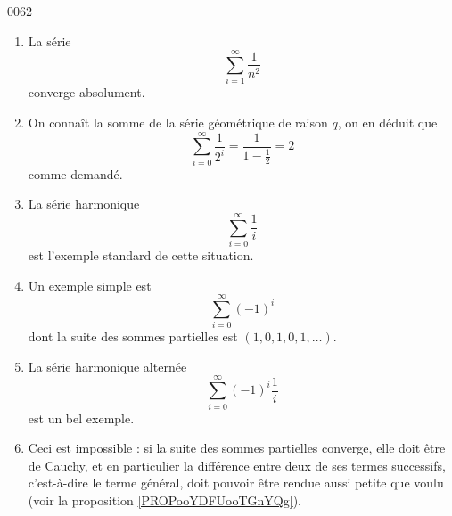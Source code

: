 
\begin{corrige}{0062}

\begin{enumerate}

\item
La série
\begin{equation*}
	\sum_{i=1}^\infty \frac{1}{n^2}
\end{equation*}
converge absolument.

\item
On connaît la somme de la série géométrique de raison $q$, on en
  déduit que
  \begin{equation*}
    \sum_{i=0}^\infty \frac1{2^i} = \frac1{1-\frac12} = 2
  \end{equation*}
  comme demandé.

\item
La série harmonique
  \begin{equation*}
    \sum_{i=0}^\infty \frac1i
  \end{equation*}
  est l'exemple standard de cette situation.

\item
Un exemple simple est
  \begin{equation*}
    \sum_{i=0}^\infty {(-1)^i}
  \end{equation*}
  dont la suite des sommes partielles est $(1, 0, 1, 0, 1, \ldots)$.

\item
La série harmonique alternée
  \begin{equation*}
    \sum_{i=0}^\infty {(-1)}^i\frac1i
  \end{equation*}
  est un bel exemple.

\item
Ceci est impossible : si la suite des sommes partielles converge, elle doit être de Cauchy, et en particulier la différence entre deux de ses termes successifs, c'est-à-dire le terme général, doit pouvoir être rendue aussi petite que voulu (voir la proposition \ref{PROPooYDFUooTGnYQg}).  
\end{enumerate}


\end{corrige}
